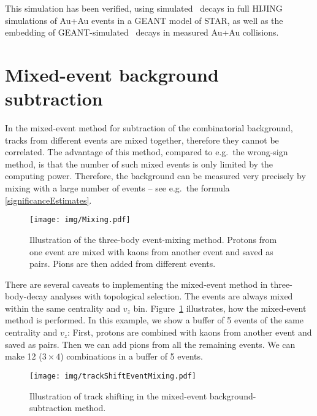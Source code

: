 This simulation has been verified, using simulated \Lambdacpm\ decays in full HIJING simulations of Au+Au events in a GEANT model of STAR, as well as the embedding of GEANT-simulated \Lambdacpm\ decays in measured Au+Au collisions\@.


\section{Mixed-event background subtraction}
In the mixed-event method for subtraction of the combinatorial background, tracks from different events are mixed together, therefore they cannot be correlated. The advantage of this method, compared to e.g.\ the wrong-sign method, is that the number of such mixed events is only limited by the computing power. Therefore, the background can be measured very precisely by mixing with a large number of events -- see e.g.\ the formula \eqref{significanceEstimates}. 

\begin{figure}[htb]
\centering
\texttt{[image: img/Mixing.pdf]}

\caption[Illustration of the three-body event-mixing method.]{\label{fig:mixedIllustration}Illustration of the three-body event-mixing method. Protons from one event are mixed with kaons from another event and saved as pairs. Pions are then added from different events.}

\end{figure}




There are several caveats to implementing the mixed-event method in three-body-decay analyses with topological selection. The events are always mixed within the same centrality and $v_z$ bin. Figure~\ref{fig:mixedIllustration} illustrates, how the mixed-event method is performed. In this example, we show a buffer of 5 events of the same centrality and $v_z$: First, protons are combined with kaons from another event and saved as pairs. Then we can add pions from all the remaining events. We can make 12 ($3 \times 4$) combinations in a buffer of 5 events. 


\begin{figure}[htb]
 \centering
\texttt{[image: img/trackShiftEventMixing.pdf]}

\caption[Illustration of track shifting in the mixed-event background-subtraction method.]{\label{fig:mixedShifting}Illustration of track shifting in the mixed-event background-subtraction method.}
\end{figure}

